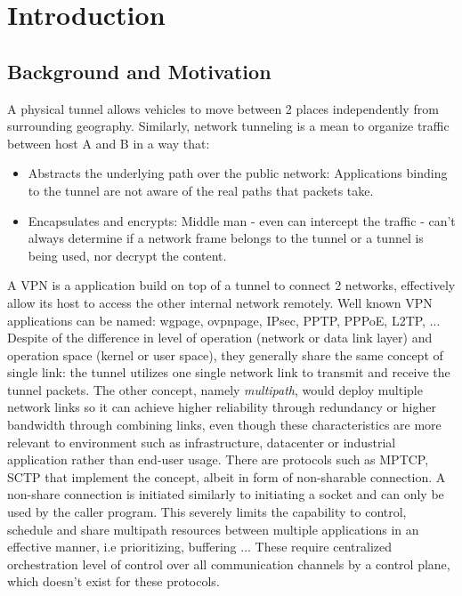 \cleardoublepage\chapter{Introduction}
\minitoc\label{sec:introduction}\vspace{.5cm}

\section{Background and Motivation}
A physical tunnel allows vehicles to move between 2 places independently from surrounding geography. 
Similarly, network tunneling is a mean to organize traffic between host A and B in a way that:

\begin{itemize}
    \item Abstracts the underlying path over the public network: Applications binding to the tunnel are not aware of the real paths that packets take.
    \item Encapsulates and encrypts: Middle man - even can intercept the traffic - can't always determine if a network frame belongs to the tunnel or a tunnel is being used, nor decrypt the content.
\end{itemize}

A \ac{VPN} is a application build on top of a tunnel to connect 2 networks, effectively allow its host to access the other internal network remotely.
Well known \ac{VPN} applications can be named: \ac{wgpage}, \ac{ovpnpage}, IPsec, PPTP, PPPoE, L2TP, ...
Despite of the difference in level of operation (network or data link layer) and operation space (kernel or user space), they generally share the same concept of single link: the tunnel utilizes one single network link to transmit and receive the tunnel packets. 
The other concept, namely \textit{multipath}, would deploy multiple network links so it can achieve higher reliability through redundancy or higher bandwidth through combining links, even though these characteristics are more relevant to environment such as infrastructure, datacenter or industrial application rather than end-user usage.
There are protocols such as \ac{MPTCP}, \ac{SCTP} that implement the concept, albeit in form of non-sharable connection.
A non-share connection is initiated similarly to initiating a socket and can only be used by the caller program. 
This severely limits the capability to control, schedule and share multipath resources between multiple applications in an effective manner, i.e prioritizing, buffering ... 
These require centralized orchestration level of control over all communication channels by a control plane, which doesn't exist for these protocols.

